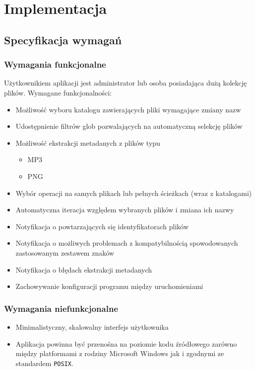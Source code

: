 \chapter{Implementacja}
\label{implementacja}

\section{Specyfikacja wymagań}
\label{specyfikacja-wymagan}

\subsection{Wymagania funkcjonalne}
Użytkownikiem aplikacji jest administrator lub osoba posiadająca dużą kolekcję plików.
Wymagane funkcjonalności:
\begin{itemize}
\item Możliwość wyboru katalogu zawierających pliki wymagające zmiany nazw
\item Udostępnienie filtrów glob pozwalających na automatyczną selekcję plików
\item Możliwość ekstrakcji metadanych z plików typu
  \begin{itemize}
  \item MP3
  \item PNG
  \end{itemize}
\item Wybór operacji na samych plikach lub pełnych ścieżkach (wraz z katalogami)
\item Automatyczna iteracja względem wybranych plików i zmiana ich nazwy
\item Notyfikacja o powtarzających się identyfikatorach plików
\item Notyfikacja o możliwych problemach z kompatybilnością spowodowanych zastosowanym zestawem znaków
\item Notyfikacja o błędach ekstrakcji metadanych
\item Zachowywanie konfiguracji programu między uruchomieniami
\end{itemize}

\subsection{Wymagania niefunkcjonalne}
\begin{itemize}
\item Minimalistyczny, skalowalny interfejs użytkownika
\item Aplikacja powinna być przenośna na poziomie kodu źródłowego zarówno między platformami z rodziny Microsoft Windows jak i zgodnymi ze standardem \texttt{POSIX}.
\end{itemize}

